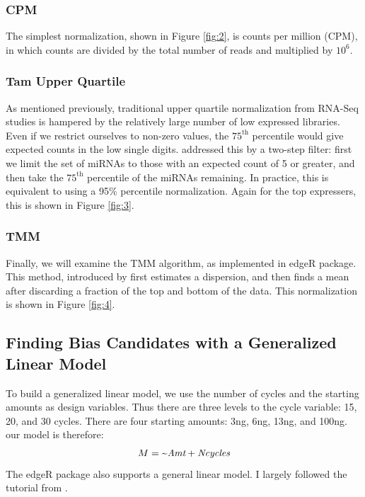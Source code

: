 \documentclass{bioinfo}
\begin{document}
\begin{methods}
\subsubsection{CPM}
The simplest normalization, shown in Figure \ref{fig:2}, is counts per million (CPM), in which counts are divided by the total number of reads and multiplied by $10^6$. \\

\subsubsection{Tam Upper Quartile}
As mentioned previously, traditional upper quartile normalization from RNA-Seq studies is hampered by the relatively large number of low expressed libraries. Even if we restrict ourselves to non-zero values, the $75^{\text{th}}$ percentile would give expected counts in the low single digits.  \citep{Tam15} addressed this by a two-step filter: first we limit the set of miRNAs to those with an expected count of 5 or greater, and then take the $75^{\text{th}}$ percentile of the miRNAs remaining. In practice, this is equivalent to using a 95\% percentile normalization. Again for the top expressers, this is shown in Figure \ref{fig:3}.
\subsubsection{TMM}
Finally, we will examine the TMM algorithm, as implemented in edgeR \citep{McCarthy12}  package. This method, introduced by \citep{Robinson10} first estimates a dispersion, and then finds a mean after discarding a fraction of the top and bottom of the data. This normalization is shown in Figure \ref{fig:4}.
\subsection{Finding Bias Candidates with a Generalized Linear Model}
To build a generalized linear model, we use the number of cycles and the starting amounts as design variables. Thus there are three levels to the cycle variable: 15, 20, and 30 cycles. There are four starting amounts: 3ng, 6ng, 13ng, and 100ng. 
our model is therefore: \\
\begin{equation}
M = \text{\textasciitilde}\text{\it{Amt}}+\text{\it{Ncycles}}\label{eq:01}
\end{equation}
The edgeR package also supports a general linear model. I largely followed the tutorial from \citep{Rueda15}.
\end{methods}
\end{document}
